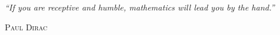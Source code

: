 \begin{titlingpage*}

\null
\vfill

\begin{flushright}
{\huge \emph{``If you are receptive and humble, mathematics will lead you by the hand.''}}\\

\vspace{10pt}

{\LARGE \scshape Paul Dirac}
\end{flushright}

\vfill
\end{titlingpage*}
